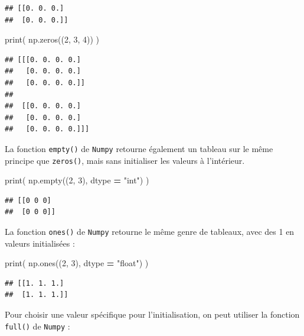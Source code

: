 \documentclass[12pt,]{book}
\newenvironment{Shaded}{\begin{snugshade}}{\end{snugshade}}
\newcommand{\DecValTok}[1]{\textcolor[rgb]{0.00,0.00,0.81}{#1}}
\newcommand{\StringTok}[1]{\textcolor[rgb]{0.31,0.60,0.02}{#1}}
\newcommand{\OperatorTok}[1]{\textcolor[rgb]{0.81,0.36,0.00}{\textbf{#1}}}
\newcommand{\BuiltInTok}[1]{#1}
\newcommand{\NormalTok}[1]{#1}
\numberwithin{equation}{section}
\numberwithin{countremarque}{section}
\begin{document}
\begin{lstlisting}
## [[0. 0. 0.]
##  [0. 0. 0.]]
\end{lstlisting}

\begin{Shaded}
\begin{Highlighting}[]
\BuiltInTok{print}\NormalTok{( np.zeros((}\DecValTok{2}\NormalTok{, }\DecValTok{3}\NormalTok{, }\DecValTok{4}\NormalTok{)) )}
\end{Highlighting}
\end{Shaded}

\begin{lstlisting}
## [[[0. 0. 0. 0.]
##   [0. 0. 0. 0.]
##   [0. 0. 0. 0.]]
## 
##  [[0. 0. 0. 0.]
##   [0. 0. 0. 0.]
##   [0. 0. 0. 0.]]]
\end{lstlisting}

La fonction \texttt{empty()} de \texttt{Numpy} retourne également un
tableau sur le même principe que \texttt{zeros()}, mais sans initialiser
les valeurs à l'intérieur.

\begin{Shaded}
\begin{Highlighting}[]
\BuiltInTok{print}\NormalTok{( np.empty((}\DecValTok{2}\NormalTok{, }\DecValTok{3}\NormalTok{), dtype }\OperatorTok{=} \StringTok{"int"}\NormalTok{) )}
\end{Highlighting}
\end{Shaded}

\begin{lstlisting}
## [[0 0 0]
##  [0 0 0]]
\end{lstlisting}

La fonction \texttt{ones()} de \texttt{Numpy} retourne le même genre de
tableaux, avec des 1 en valeurs initialisées :

\begin{Shaded}
\begin{Highlighting}[]
\BuiltInTok{print}\NormalTok{( np.ones((}\DecValTok{2}\NormalTok{, }\DecValTok{3}\NormalTok{), dtype }\OperatorTok{=} \StringTok{"float"}\NormalTok{) )}
\end{Highlighting}
\end{Shaded}

\begin{lstlisting}
## [[1. 1. 1.]
##  [1. 1. 1.]]
\end{lstlisting}

Pour choisir une valeur spécifique pour l'initialisation, on peut
utiliser la fonction \texttt{full()} de \texttt{Numpy} :
\end{document}
